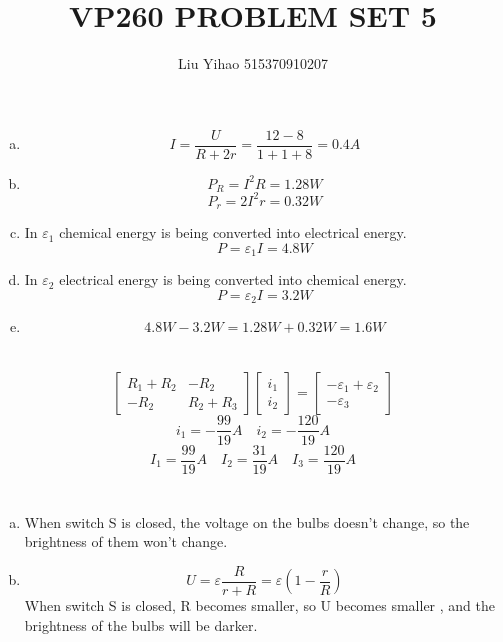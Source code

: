 \documentclass{article}
\title{VP260 PROBLEM SET 5}
\author{Liu Yihao 515370910207}
\date{}
\begin{document}
\maketitle

\section{}
\begin{enumerate}[(a)]
\item
$$I=\frac{U}{R+2r}=\frac{12-8}{1+1+8}=0.4A$$
\item
$$P_R=I^2R=1.28W$$
$$P_r=2I^2r=0.32W$$
\item
In $\varepsilon_1$ chemical energy is being converted into electrical energy.
$$P=\varepsilon_1I=4.8W$$
\item
In $\varepsilon_2$ electrical energy is being converted into chemical energy.
$$P=\varepsilon_2I=3.2W$$
\item
$$4.8W-3.2W=1.28W+0.32W=1.6W$$
\end{enumerate}

\section{}
\begin{equation*}
\begin{bmatrix} R_1+R_2 & -R_2 \\ -R_2 & R_2+R_3 \end{bmatrix}
\begin{bmatrix} i_1 \\ i_2 \end{bmatrix}=
\begin{bmatrix} -\varepsilon_1+\varepsilon_2 \\ -\varepsilon_3 \end{bmatrix}
\end{equation*}
$$i_1=-\frac{99}{19}A\quad i_2=-\frac{120}{19}A$$
$$I_1=\frac{99}{19}A\quad I_2=\frac{31}{19}A\quad I_3=\frac{120}{19}A$$

\section{}
\begin{enumerate}[(a)]
\item
When switch S is closed, the voltage on the bulbs doesn't change, so the brightness of them won't change.
\item
$$U=\varepsilon\frac{R}{r+R}=\varepsilon\left(1-\frac{r}{R}\right)$$
When switch S is closed, R becomes smaller, so U becomes smaller , and the brightness of the bulbs will be darker.
\end{enumerate}
\end{document}
